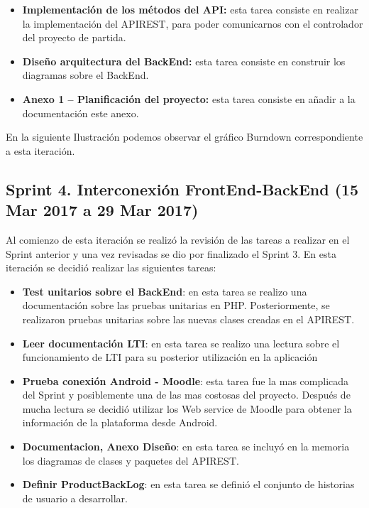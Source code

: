 \begin{itemize}

	\item \textbf{Implementación de los métodos del API:} esta tarea consiste en realizar la implementación del APIREST, para poder comunicarnos con el controlador del proyecto de partida.

	\item \textbf{Diseño arquitectura del BackEnd:} esta tarea consiste en construir los diagramas sobre el BackEnd.

	\item \textbf{Anexo 1 – Planificación del proyecto:} esta tarea consiste en añadir a la documentación este anexo.
\end{itemize}

En la siguiente Ilustración podemos observar el gráfico Burndown correspondiente a esta iteración.


\subsection{Sprint 4. Interconexión FrontEnd-BackEnd (15 Mar 2017 a 29 Mar 2017)}

Al comienzo de esta iteración se realizó la revisión de las tareas a realizar en el Sprint anterior y una vez revisadas se dio por finalizado el Sprint 3. 
En esta iteración se decidió realizar las siguientes tareas:

\begin{itemize}

	\item \textbf{Test unitarios sobre el BackEnd}: en esta tarea se realizo una documentación sobre las pruebas unitarias en PHP. Posteriormente, se realizaron pruebas unitarias sobre las nuevas clases creadas en el APIREST.
	\item \textbf{Leer documentación LTI}: en esta tarea se realizo una lectura sobre el funcionamiento de LTI para su posterior utilización en la aplicación
	\item \textbf{Prueba conexión Android - Moodle}: esta tarea fue la mas complicada del Sprint y posiblemente una de las mas costosas del proyecto. Después de mucha lectura se decidió utilizar los Web service de Moodle para obtener la información de la plataforma desde Android.
	\item \textbf{Documentacion, Anexo Diseño}: en esta tarea se incluyó en la memoria los diagramas de clases y paquetes del APIREST.
	\item \textbf{Definir ProductBackLog}: en esta tarea se definió el conjunto de historias de usuario a desarrollar.

\end{itemize}

